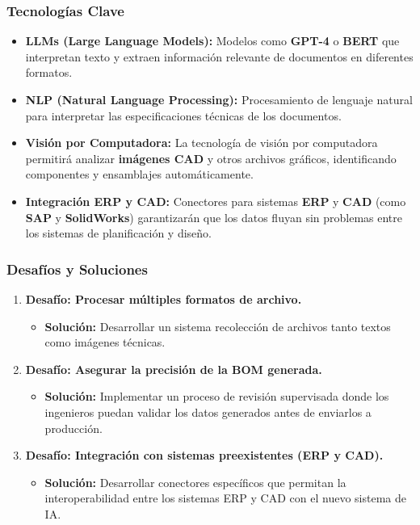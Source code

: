 \documentclass[
  10pt,
  letterpaper,
]{book}
\providecommand{\tightlist}{%
  \setlength{\itemsep}{0pt}\setlength{\parskip}{0pt}}\usepackage{longtable,booktabs,array}
\begin{document}
\subsubsection{Tecnologías Clave}\label{tecnologuxedas-clave}

\begin{itemize}
\tightlist
\item
  \textbf{LLMs (Large Language Models):} Modelos como \textbf{GPT-4} o
  \textbf{BERT} que interpretan texto y extraen información relevante de
  documentos en diferentes formatos.
\item
  \textbf{NLP (Natural Language Processing):} Procesamiento de lenguaje
  natural para interpretar las especificaciones técnicas de los
  documentos.
\item
  \textbf{Visión por Computadora:} La tecnología de visión por
  computadora permitirá analizar \textbf{imágenes CAD} y otros archivos
  gráficos, identificando componentes y ensamblajes automáticamente.
\item
  \textbf{Integración ERP y CAD:} Conectores para sistemas \textbf{ERP}
  y \textbf{CAD} (como \textbf{SAP} y \textbf{SolidWorks}) garantizarán
  que los datos fluyan sin problemas entre los sistemas de planificación
  y diseño.
\end{itemize}

\subsubsection{Desafíos y Soluciones}\label{desafuxedos-y-soluciones}

\begin{enumerate}
\def\labelenumi{\arabic{enumi}.}
\tightlist
\item
  \textbf{Desafío: Procesar múltiples formatos de archivo.}

  \begin{itemize}
  \tightlist
  \item
    \textbf{Solución:} Desarrollar un sistema recolección de archivos
    tanto textos como imágenes técnicas.
  \end{itemize}
\item
  \textbf{Desafío: Asegurar la precisión de la BOM generada.}

  \begin{itemize}
  \tightlist
  \item
    \textbf{Solución:} Implementar un proceso de revisión supervisada
    donde los ingenieros puedan validar los datos generados antes de
    enviarlos a producción.
  \end{itemize}
\item
  \textbf{Desafío: Integración con sistemas preexistentes (ERP y CAD).}

  \begin{itemize}
  \tightlist
  \item
    \textbf{Solución:} Desarrollar conectores específicos que permitan
    la interoperabilidad entre los sistemas ERP y CAD con el nuevo
    sistema de IA.
  \end{itemize}
\end{enumerate}
\end{document}
